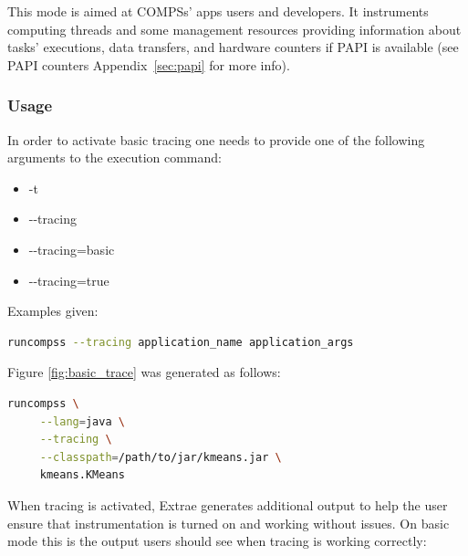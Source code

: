 This mode is aimed at COMPSs' apps users and developers. It instruments computing threads and some management resources providing 
information about tasks' executions, data transfers, and hardware counters if PAPI is available (see PAPI counters Appendix~\ref{sec:papi} 
for more info). 

\subsubsection{Usage}

In order to activate basic tracing one needs to provide one of the following arguments to the execution command:

\begin{itemize}
 \item -t
 \item -{}-tracing
 \item -{}-tracing=basic
 \item -{}-tracing=true
\end{itemize}


\noindent Examples given:

\begin{lstlisting}[language=bash]
runcompss --tracing application_name application_args
\end{lstlisting}

\noindent Figure \ref{fig:basic_trace} was generated as follows:


\begin{lstlisting}[language=bash]
runcompss \
     --lang=java \
     --tracing \
     --classpath=/path/to/jar/kmeans.jar \
     kmeans.KMeans
\end{lstlisting}

When tracing is activated, Extrae generates additional output to help the user ensure that instrumentation is turned on and working 
without issues. On basic mode this is the output users should see when tracing is working correctly:

